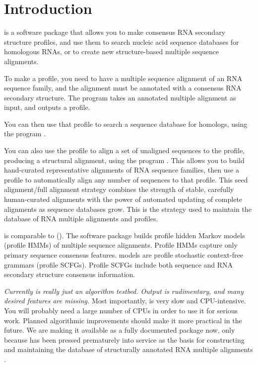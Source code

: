 \section{Introduction}

 is a software package that allows you to make
consensus RNA secondary structure profiles, and use them to search
nucleic acid sequence databases for homologous RNAs, or to create new
structure-based multiple sequence alignments.

To make a profile, you need to have a multiple sequence alignment of
an RNA sequence family, and the alignment must be annotated with a
consensus RNA secondary structure. The program  takes an
annotated multiple alignment as input, and outputs a profile.

You can then use that profile to search a sequence database for homologs,
using the program .

You can also use the profile to align a set of unaligned sequences to
the profile, producing a structural alignment, using the program
. This allows you to build hand-curated representative
alignments of RNA sequence families, then use a profile to
automatically align any number of sequences to that profile.  This
seed alignment/full alignment strategy combines the strength of
stable, carefully human-curated alignments with the power of automated
updating of complete alignments as sequence databases grow. This is
the strategy used to maintain the  database of RNA
multiple alignments and profiles.

 is comparable to 
().  The
 software package builds profile hidden Markov models
(profile HMMs) of multiple sequence alignments. Profile HMMs capture
only primary sequence consensus features.  models
are profile stochastic context-free grammars (profile SCFGs).  Profile
SCFGs include both sequence and RNA secondary structure consensus
information.

\emph{Currently  is really just an algorithm
testbed. Output is rudimentary, and many desired features are
missing.} Most importantly,  is very slow and
CPU-intensive. You will probably need a large number of CPUs in order
to use it for serious work. Planned algorithmic improvements should
make it more practical in the future. We are making it available as a
fully documented package now, only because  has
been pressed prematurely into service as the basis for constructing
and maintaining the  database of structurally annotated
RNA multiple alignments \cite{Griffiths-Jones03}.










